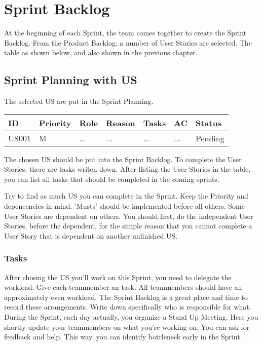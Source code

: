 \documentclass[10pt]{report}
\begin{document}
\newpage

\section{Sprint Backlog}

At the beginning of each Sprint, the team comes together to create the Sprint Backlog. From the Product Backlog, a number of User Stories are selected. The table as shown below, and also shown in the previous chapter.

\subsection{Sprint Planning with US}

The selected US are put in the Sprint Planning. 

\medskip
\begin{tabularx}{0.8\textwidth} {
  | >{\raggedright\arraybackslash}X 
  | >{\centering\arraybackslash}X 
  | >{\raggedright\arraybackslash}X 
  | >{\raggedright\arraybackslash}X 
  | >{\raggedright\arraybackslash}X 
  | >{\raggedright\arraybackslash}X 
  | >{\raggedleft\arraybackslash}X | }
 \hline
 ID & Priority & Role & Reason & Tasks & AC & Status \\
 \hline
 US001 & M & ... & ...  & ... & ... & Pending \\
 \hline
\end{tabularx}
\medskip

\noindent The chosen US should be put into the Sprint Backlog. To complete the User Stories, there are tasks writen down. After lIsting the User Stories in the table, you can list all tasks that should be completed in the coming sprints. 

Try to find as much US you can complete in the Sprint. Keep the Priority and depencencies in mind. 'Musts' should be implemented before all others. Some User Stories are dependent on others. You should first, do the independent User Stories, before the dependent, for the simple reason that you cannot complete a User Story that is dependent on another unfinished US.

\subsubsection{Tasks}

After chosing the US you'll work on this Sprint, you need to delegate the workload. Give each teammember an task. All teammembers should have an approximately even workload. The Sprint Backlog is a great place and time to record these arrangements. Write down specifically who is responsible for what. During the Sprint, each day actually, you organize a Stand Up Meeting. Here you shortly update your teammembers on what you're working on. You can ask for feedback and help. This way, you can identify bottleneck early in the Sprint.
\end{document}
